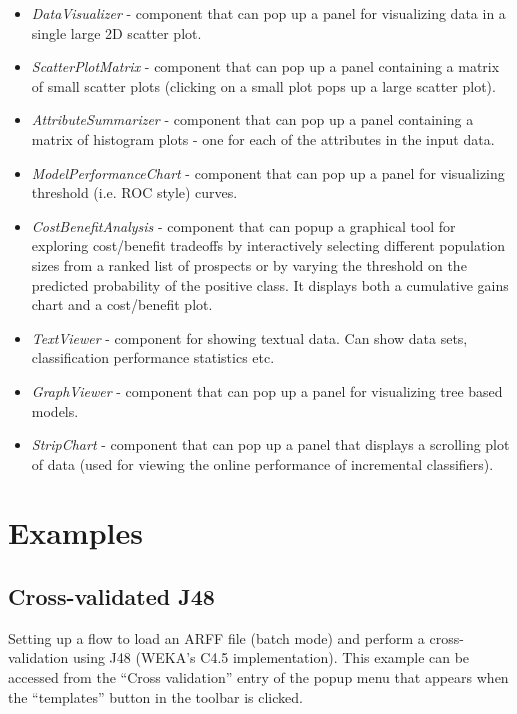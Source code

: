 \begin{itemize}
	\item \textit{DataVisualizer} - component that can pop up a panel for 
	visualizing data in a single large 2D scatter plot.
	\item \textit{ScatterPlotMatrix} - component that can pop up a panel 
	containing a matrix of small scatter plots (clicking on a small plot 
	pops up a large scatter plot).
	\item \textit{AttributeSummarizer} - component that can pop up a panel 
	containing a matrix of histogram plots - one for each of the attributes 
	in the input data.
	\item \textit{ModelPerformanceChart} - component that can pop up a 
	panel for visualizing threshold (i.e. ROC style) curves.
        \item \textit{CostBenefitAnalysis} - component that can popup a graphical
          tool for exploring cost/benefit tradeoffs by interactively selecting
          different population sizes from a ranked list of prospects or by 
          varying the threshold on the predicted probability of the positive class. It
          displays both a cumulative gains chart and a cost/benefit plot.
	\item \textit{TextViewer} - component for showing textual data. Can show 
	data sets, classification performance statistics etc.
	\item \textit{GraphViewer} - component that can pop up a panel for 
	visualizing tree based models.
	\item \textit{StripChart} - component that can pop up a panel that displays 
	a scrolling plot of data (used for viewing the online performance of 
	incremental classifiers).
\end{itemize}


\newpage
\section{Examples}


\subsection{Cross-validated J48}
Setting up a flow to load an ARFF file (batch mode) and
perform a cross-validation using J48 (WEKA's C4.5 implementation). This example
can be accessed from the ``Cross validation'' entry of the popup menu that
appears when the ``templates'' button in the toolbar is clicked.

